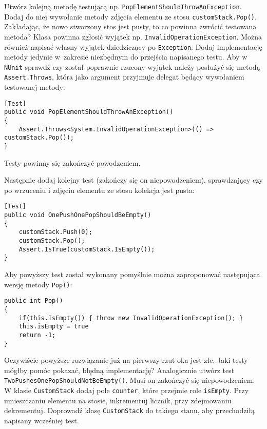 Utwórz kolejną metodę testującą np. \texttt{PopElementShouldThrowAnException}. Dodaj do niej wywołanie metody zdjęcia elementu ze stosu \texttt{customStack.Pop()}. Zakładając, że nowo stworzony stos jest pusty, to co powinna zwrócić testowana metoda? Klasa powinna zgłosić wyjątek np. \texttt{InvalidOperationException}. Można również napisać własny wyjątek dziedziczący po \texttt{Exception}. Dodaj implementację metody jedynie w~zakresie niezbędnym do przejścia napisanego testu. Aby w \texttt{NUnit} sprawdź czy został poprawnie rzucony wyjątek należy posłużyć się metodą \texttt{Assert.Throws}, która jako argument przyjmuje delegat będący wywołaniem testowanej metody:
\begin{lstlisting}
[Test]
public void PopElementShouldThrowAnException()
{         
	Assert.Throws<System.InvalidOperationException>(() => customStack.Pop());
}
\end{lstlisting}
Testy powinny się zakończyć powodzeniem.

Następnie dodaj kolejny test (zakończy się on niepowodzeniem), sprawdzający czy po wrzuceniu i zdjęciu elementu ze stosu kolekcja jest pusta:
\begin{lstlisting}
[Test]
public void OnePushOnePopShouldBeEmpty()
{
	customStack.Push(0);
	customStack.Pop();
	Assert.IsTrue(customStack.IsEmpty());
}
\end{lstlisting}

Aby powyższy test został wykonany pomyślnie można zaproponować następująca wersję metody \texttt{Pop()}:
\begin{lstlisting}
public int Pop()
{
	if(this.IsEmpty()) { throw new InvalidOperationException(); }
	this.isEmpty = true
	return -1;
}
\end{lstlisting}

Oczywiście powyższe rozwiązanie już na pierwszy rzut oka jest złe. Jaki testy mógłby pomóc pokazać, błędną implementację? Analogicznie utwórz test \texttt{TwoPushesOnePopShouldNotBeEmpty()}. Musi on zakończyć się niepowodzeniem. W klasie \texttt{CustomStack} dodaj pole \texttt{counter}, które przejmie role \texttt{isEmpty}. Przy umieszczaniu elementu na stosie, inkrementuj licznik, przy zdejmowaniu dekrementuj. Doprowadź klasę \texttt{CustomStack} do takiego stanu, aby przechodziłą napisany wcześniej test.


